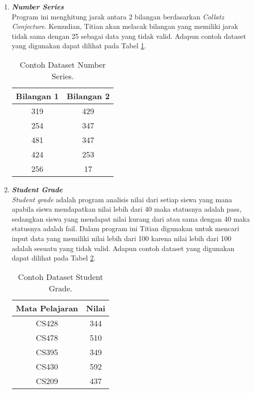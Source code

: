 \begin{enumerate}
      \item \emph{\textbf{Number Series}} \\
            Program ini menghitung jarak antara 2 bilangan berdasarkan \emph{Collatz Conjecture}. Kemudian, Titian akan melacak bilangan yang memiliki jarak tidak sama dengan 25 sebagai data yang tidak valid.
            Adapun contoh dataset yang digunakan dapat 
            dilihat pada Tabel \ref{tb:numberseriesdataset}.

            \begin{longtable}{|c|c|}
                  \caption{Contoh Dataset Number Series.}
                  \label{tb:numberseriesdataset} \\
                  \hline
                  \rowcolor[HTML]{C0C0C0}
                  \textbf{Bilangan 1} & \textbf{Bilangan 2} \\
                  \hline
                  319 & 429 \\
                  254 & 347 \\
                  481 & 347 \\
                  424 & 253 \\
                  256 & 17 \\
                  \hline
            \end{longtable}

      \item \emph{\textbf{Student Grade}} \\
            \emph{Student grade} adalah program analisis nilai dari setiap siswa yang mana apabila siswa mendapatkan nilai lebih dari 40 maka statusnya adalah pass, sedangkan siswa yang mendapat nilai kurang dari atau sama dengan 40 maka statusnya adalah fail. Dalam program ini Titian digunakan untuk mencari input data yang memiliki nilai lebih dari 100 karena nilai lebih dari 100 adalah sesuatu yang tidak valid.
            Adapun contoh dataset yang digunakan dapat 
            dilihat pada Tabel \ref{tb:studentgradedataset}.

            \begin{longtable}{|c|c|}
                  \caption{Contoh Dataset Student Grade.}
                  \label{tb:studentgradedataset} \\
                  \hline
                  \rowcolor[HTML]{C0C0C0}
                  \textbf{Mata Pelajaran} & \textbf{Nilai} \\
                  \hline
                  CS428 & 344 \\
                  CS478 & 510 \\
                  CS395 & 349 \\
                  CS430 & 592 \\
                  CS209 & 437 \\
                  \hline
            \end{longtable}


\end{enumerate}
